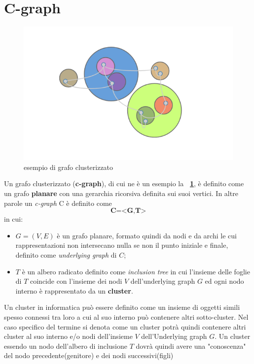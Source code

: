 {\section{C-graph}
\begin{figure}[!htb]
	\begin{center}
		\includegraphics[width=0.9 \linewidth]{figure/cgraphGenerico}
	\end{center}
	\caption{esempio di grafo clusterizzato \label{fig:cgraphGenerico}}
\end{figure}
Un grafo clusterizzato (\textbf{c-graph}), di cui ne è un esempio la \textbf{\figurename~\ref{fig:cgraphGenerico}}, è definito come un grafo \textbf{planare} con una gerarchia ricorsiva definita sui suoi vertici. In altre parole un \textit{c-graph} C è definito come $$\textbf{C=<G,T>}$$ 
in cui:
\begin{itemize}
	\item\textbf{$G=(V,E)$} è un grafo planare, formato quindi da nodi e da archi le cui rappresentazioni non intersecano nulla se non il punto iniziale e finale, definito come \textit{underlying graph} di $C$;
	\item\textbf{$T$} è un albero radicato definito come \textit{inclusion tree} in cui l'insieme delle foglie di $T$ coincide con l'insieme dei nodi $V$ dell'underlying graph $G$ ed ogni nodo interno è rappresentato da un \textbf{cluster}.
\end{itemize}
Un cluster in informatica può essere definito come un insieme di oggetti simili spesso connessi tra loro a cui al suo interno può contenere altri sotto-cluster.
Nel caso specifico del termine si denota come un cluster potrà quindi contenere altri cluster al suo interno e/o nodi dell'insieme $V$ dell'Underlying graph $G$.
Un cluster essendo un nodo dell'albero di inclusione $T$ dovrà quindi avere una "conoscenza" del nodo precedente(genitore) e dei nodi successivi(figli) 

}
